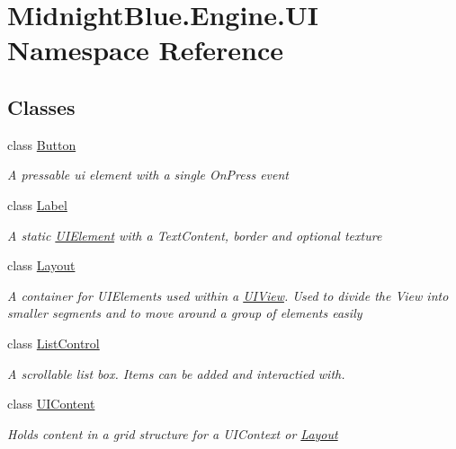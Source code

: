 \hypertarget{namespace_midnight_blue_1_1_engine_1_1_u_i}{}\section{Midnight\+Blue.\+Engine.\+UI Namespace Reference}
\label{namespace_midnight_blue_1_1_engine_1_1_u_i}
\subsection*{Classes}
\begin{DoxyCompactItemize}
\item 
class \hyperlink{class_midnight_blue_1_1_engine_1_1_u_i_1_1_button}{Button}
\begin{DoxyCompactList}\small\item\em A pressable ui element with a single On\+Press event \end{DoxyCompactList}\item 
class \hyperlink{class_midnight_blue_1_1_engine_1_1_u_i_1_1_label}{Label}
\begin{DoxyCompactList}\small\item\em A static \hyperlink{class_midnight_blue_1_1_engine_1_1_u_i_1_1_u_i_element}{U\+I\+Element} with a Text\+Content, border and optional texture \end{DoxyCompactList}\item 
class \hyperlink{class_midnight_blue_1_1_engine_1_1_u_i_1_1_layout}{Layout}
\begin{DoxyCompactList}\small\item\em A container for U\+I\+Elements used within a \hyperlink{class_midnight_blue_1_1_engine_1_1_u_i_1_1_u_i_view}{U\+I\+View}. Used to divide the View into smaller segments and to move around a group of elements easily \end{DoxyCompactList}\item 
class \hyperlink{class_midnight_blue_1_1_engine_1_1_u_i_1_1_list_control}{List\+Control}
\begin{DoxyCompactList}\small\item\em A scrollable list box. Items can be added and interactied with. \end{DoxyCompactList}\item 
class \hyperlink{class_midnight_blue_1_1_engine_1_1_u_i_1_1_u_i_content}{U\+I\+Content}
\begin{DoxyCompactList}\small\item\em Holds content in a grid structure for a U\+I\+Context or \hyperlink{class_midnight_blue_1_1_engine_1_1_u_i_1_1_layout}{Layout} \end{DoxyCompactList}\item 

\end{DoxyCompactItemize}
